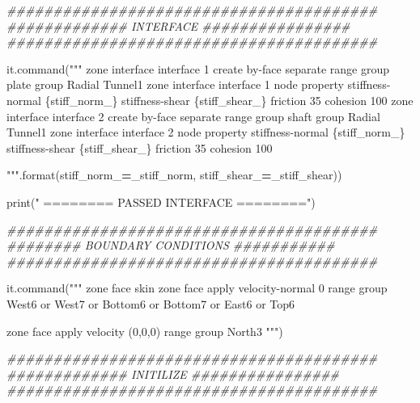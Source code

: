 \documentclass[a4paper, nobind]{templates/ociamthesis}
\newenvironment{Shaded}{\begin{snugshade}}{\end{snugshade}}
\newcommand{\BuiltInTok}[1]{#1}
\newcommand{\CommentTok}[1]{\textcolor[rgb]{0.56,0.35,0.01}{\textit{#1}}}
\newcommand{\NormalTok}[1]{#1}
\newcommand{\OperatorTok}[1]{\textcolor[rgb]{0.81,0.36,0.00}{\textbf{#1}}}
\newcommand{\SpecialCharTok}[1]{\textcolor[rgb]{0.00,0.00,0.00}{#1}}
\newcommand{\StringTok}[1]{\textcolor[rgb]{0.31,0.60,0.02}{#1}}
\renewenvironment{Shaded}
{
  \vspace{10pt}%
  \begin{snugshade}%
}{%
  \end{snugshade}%
  \vspace{8pt}%
}
\begin{document}
\begin{Shaded}
\begin{Highlighting}[]
\CommentTok{\#\#\#\#\#\#\#\#\#\#\#\#\#\#\#\#\#\#\#\#\#\#\#\#\#\#\#\#\#\#\#\#\#\#\#\#\#\#\#\#}
\CommentTok{\#\#\#\#\#\#\#\#\#\#\#\#\# INTERFACE \#\#\#\#\#\#\#\#\#\#\#\#\#\#\#\#}
\CommentTok{\#\#\#\#\#\#\#\#\#\#\#\#\#\#\#\#\#\#\#\#\#\#\#\#\#\#\#\#\#\#\#\#\#\#\#\#\#\#\#\#}

\NormalTok{it.command(}\StringTok{"""}
\StringTok{zone interface \textquotesingle{}interface 1\textquotesingle{} create by{-}face separate range group \textquotesingle{}plate\textquotesingle{} group \textquotesingle{}Radial Tunnel1\textquotesingle{}}
\StringTok{zone interface \textquotesingle{}interface 1\textquotesingle{} node property stiffness{-}normal }\SpecialCharTok{\{stiff\_norm\_\}}\StringTok{ stiffness{-}shear }\SpecialCharTok{\{stiff\_shear\_\}}\StringTok{ friction 35 cohesion 100}
\StringTok{zone interface \textquotesingle{}interface 2\textquotesingle{} create by{-}face separate range group \textquotesingle{}shaft\textquotesingle{} group \textquotesingle{}Radial Tunnel1\textquotesingle{}}
\StringTok{zone interface \textquotesingle{}interface 2\textquotesingle{} node property stiffness{-}normal }\SpecialCharTok{\{stiff\_norm\_\}}\StringTok{ stiffness{-}shear }\SpecialCharTok{\{stiff\_shear\_\}}\StringTok{ friction 35 cohesion 100}

\StringTok{"""}\NormalTok{.}\BuiltInTok{format}\NormalTok{(stiff\_norm\_}\OperatorTok{=}\NormalTok{\_stiff\_norm, stiff\_shear\_}\OperatorTok{=}\NormalTok{\_stiff\_shear))}

\BuiltInTok{print}\NormalTok{(}\StringTok{"               ======== PASSED INTERFACE ========"}\NormalTok{)}

\CommentTok{\#\#\#\#\#\#\#\#\#\#\#\#\#\#\#\#\#\#\#\#\#\#\#\#\#\#\#\#\#\#\#\#\#\#\#\#\#\#\#\#}
\CommentTok{\#\#\#\#\#\#\#\# BOUNDARY CONDITIONS \#\#\#\#\#\#\#\#\#\#\#}
\CommentTok{\#\#\#\#\#\#\#\#\#\#\#\#\#\#\#\#\#\#\#\#\#\#\#\#\#\#\#\#\#\#\#\#\#\#\#\#\#\#\#\#}

\NormalTok{it.command(}\StringTok{"""}
\StringTok{zone face skin}
\StringTok{zone face apply velocity{-}normal 0 range group \textquotesingle{}West6\textquotesingle{} or \textquotesingle{}West7\textquotesingle{} or \textquotesingle{}Bottom6\textquotesingle{} or \textquotesingle{}Bottom7\textquotesingle{} or \textquotesingle{}East6\textquotesingle{} or \textquotesingle{}Top6\textquotesingle{}}

\StringTok{zone face apply velocity (0,0,0) range group \textquotesingle{}North3\textquotesingle{}}
\StringTok{"""}\NormalTok{)}

\CommentTok{\#\#\#\#\#\#\#\#\#\#\#\#\#\#\#\#\#\#\#\#\#\#\#\#\#\#\#\#\#\#\#\#\#\#\#\#\#\#\#\#}
\CommentTok{\#\#\#\#\#\#\#\#\#\#\#\#\# INITILIZE \#\#\#\#\#\#\#\#\#\#\#\#\#\#\#\#}
\CommentTok{\#\#\#\#\#\#\#\#\#\#\#\#\#\#\#\#\#\#\#\#\#\#\#\#\#\#\#\#\#\#\#\#\#\#\#\#\#\#\#\#}


\end{Highlighting}
\end{Shaded}
\end{document}
